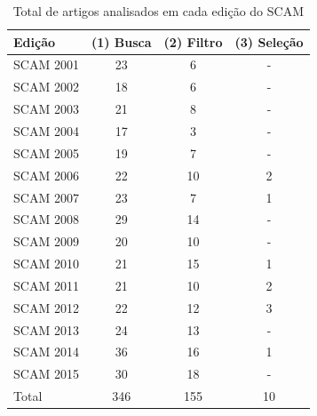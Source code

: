 \begin{table}[H]
\caption{Total de artigos analisados em cada edição do SCAM}
\centering
\begin{tabular}{| l | c | c | c |}
\hline
Edição & (1) Busca & (2) Filtro & (3) Seleção \\
\hline
SCAM 2001 & 23    & 6         & -           \\
SCAM 2002 & 18    & 6         & -           \\
SCAM 2003 & 21    & 8         & -           \\
SCAM 2004 & 17    & 3         & -           \\
SCAM 2005 & 19    & 7         & -           \\
SCAM 2006 & 22    & 10        & 2           \\
SCAM 2007 & 23    & 7         & 1           \\
SCAM 2008 & 29    & 14        & -           \\
SCAM 2009 & 20    & 10        & -           \\
SCAM 2010 & 21    & 15        & 1           \\
SCAM 2011 & 21    & 10        & 2           \\
SCAM 2012 & 22    & 12        & 3           \\
SCAM 2013 & 24    & 13        & -           \\
SCAM 2014 & 36    & 16        & 1           \\
SCAM 2015 & 30    & 18        & -           \\
\hline
Total     & 346   & 155       & 10          \\
\hline
\end{tabular}
\label{artigos-do-scam}
\end{table}

